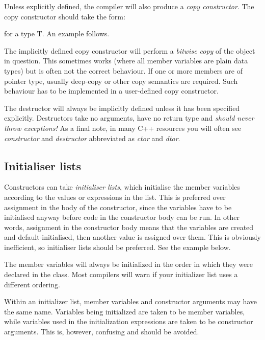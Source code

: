 \documentclass[a4paper]{scrartcl}
\begin{document}


Unless explicitly defined, the compiler will also produce a \emph{copy constructor}. The copy constructor should take the form:



for a type T. An example follows.



The implicitly defined copy constructor will perform a \emph{bitwise copy} of the object in question. This sometimes works (where all member variables are plain data types) but is often not the correct behaviour. If one or more members are of pointer type, usually deep-copy or other copy semantics are required. Such behaviour has to be implemented in a user-defined copy constructor.

The destructor will always be implicitly defined unless it has been specified explicitly. Destructors take no arguments, have no return type and \emph{should never throw exceptions!} As a final note, in many C++ resources you will often see \emph{constructor} and \emph{destructor} abbreviated as \emph{ctor} and \emph{dtor}.

\subsection{Initialiser lists}
Constructors can take \emph{initialiser lists}, which initialise the member variables according to the values or expressions in the list. This is preferred over assignment in the body of the constructor, since the variables have to be initialised anyway before code in the constructor body can be run. In other words, assignment in the constructor body means that the variables are created and default-initialised, then another value is assigned over them. This is obviously inefficient, so initialiser lists should be preferred. See the example below.



The member variables will always be initialized in the order in which they were declared in the class. Most compilers will warn if your initializer list uses a different ordering.

Within an initializer list, member variables and constructor arguments may have the same name. Variables being initialized are taken to be member variables, while variables used in the initialization expressions are taken to be constructor arguments. This is, however, confusing and should be avoided.
\end{document}
